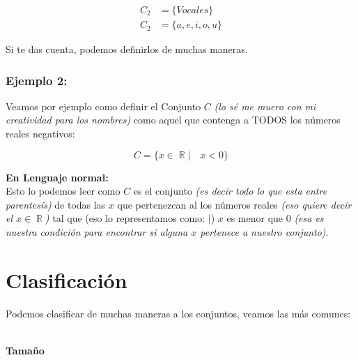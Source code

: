 \documentclass[12pt]{report}                                    %
\DeclareMathOperator \Reals {\mathbb{R}}                        %
\begin{document}
                \begin{equation*}   
                \begin{split}   
                    C_2 &= \{ Vocales \}            \\
                    C_2 &= \{a, e, i, o, u \}
                \end{split}   
                \end{equation*}

                Si te das cuenta, podemos definirlos de muchas maneras.


            \subsubsection*{Ejemplo 2:}

                Veamos por ejemplo como definir el Conjunto $C$ \emph{(lo sé me muero con
                mi creatividad para los nombres)} como aquel que contenga a TODOS los números
                reales negativos:

                \begin{equation*}   
                    C = \{ x \in \Reals |\quad x < 0 \}
                \end{equation*}

                \textbf{En Lenguaje normal:\\}
                Esto lo podemos leer como $C$ es el conjunto \emph{(es decir todo lo que esta
                entre parentesís)} de todas las $x$ que pertenezcan al los números reales
                \emph{(eso quiere decir el $x \in \Reals$)} tal que (eso lo representamos
                como: $|$) $x$ es menor que 0 \emph{(esa es nuestra condición para
                encontrar si alguna $x$ pertenece a nuestro conjunto)}.



    \clearpage
    \section{Clasificación}
            
        Podemos clasificar de muchas maneras a los conjuntos, veamos las más comunes:

        \textbf{\large \\Tamaño}
\end{document}

